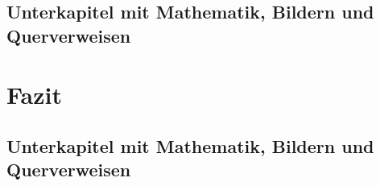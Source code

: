 \section{Unterkapitel mit Mathematik, Bildern und Querverweisen}

\chapter{Fazit}

\section{Unterkapitel mit Mathematik, Bildern und Querverweisen}






\listoffigures %
\listoftables %


